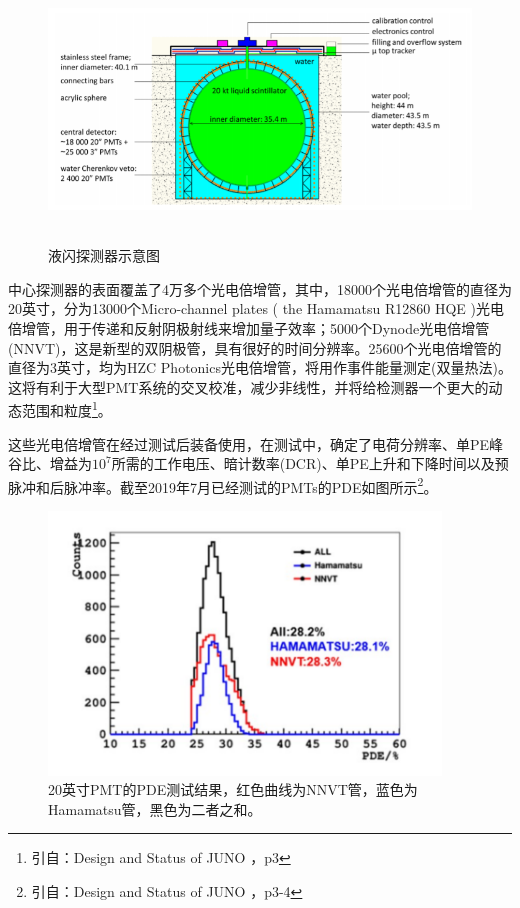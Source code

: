 \documentclass[15pt,a4paper]{article}
\begin{document}
\begin{figure}[ht]
 \centering
 \includegraphics[height=7cm]{images/探测器示意图.png}
 \caption{液闪探测器示意图}
 \label{fig:singleblock}
\end{figure}

中心探测器的表面覆盖了4万多个光电倍增管，其中，18000个光电倍增管的直径为20英寸，分为13000个Micro-channel plates ( the Hamamatsu R12860 HQE )光电倍增管，用于传递和反射阴极射线来增加量子效率；5000个Dynode光电倍增管(NNVT)，这是新型的双阴极管，具有很好的时间分辨率。25600个光电倍增管的直径为3英寸，均为HZC Photonics光电倍增管，将用作事件能量测定(双量热法)。这将有利于大型PMT系统的交叉校准，减少非线性，并将给检测器一个更大的动态范围和粒度\footnote{引自：Design and Status of JUNO ，p3}。

这些光电倍增管在经过测试后装备使用，在测试中，确定了电荷分辨率、单PE峰谷比、增益为$10^7$所需的工作电压、暗计数率(DCR)、单PE上升和下降时间以及预脉冲和后脉冲率。截至2019年7月已经测试的PMTs的PDE如图所示\footnote{引自：Design and Status of JUNO ，p3-4}。

\begin{figure}[ht]
 \centering
 \includegraphics[height=7cm]{images/pmt测试.png}
 \caption{20英寸PMT的PDE测试结果，红色曲线为NNVT管，蓝色为Hamamatsu管，黑色为二者之和。}
 \label{fig:singleblock}
\end{figure}
\end{document}
